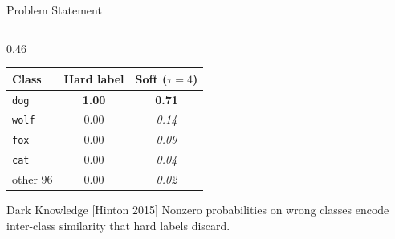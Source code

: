 \documentclass[english, hyperref={colorlinks,citecolor=blue,linkcolor=blue,urlcolor=blue}, handout]{beamer}
\begin{document}
\begin{frame}{Problem Statement}
\begin{columns}[t]
\begin{column}{0.46\textwidth}
      \begin{center}\tiny
        \begin{tabular}{lcc}
          \toprule
          Class & Hard label & Soft ($\tau{=}4$)\\
          \midrule
          \texttt{dog}   & \textbf{1.00} & \textbf{0.71}\\
          \texttt{wolf}  & 0.00 & \textit{0.14}\\
          \texttt{fox}   & 0.00 & \textit{0.09}\\
          \texttt{cat}   & 0.00 & \textit{0.04}\\
          other 96       & 0.00 & \textit{0.02}\\
          \bottomrule
        \end{tabular}
      \end{center}
      \vspace{0.1em}
      \begin{block}{\small Dark Knowledge \textnormal{\small[Hinton 2015]}}\small
        Nonzero probabilities on wrong classes encode inter-class similarity that hard labels discard.
      \end{block}
    \end{column}
  \end{columns}
\end{frame}
\end{document}
